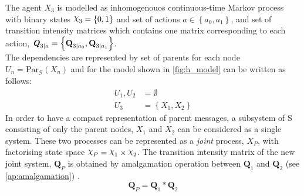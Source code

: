 The agent  $ X_{3} $ is modelled as inhomogenouos continuous-time Markov process with binary states $ \rchi_{3} = \left\lbrace 0, 1 \right\rbrace  $ and set of actions $ a \in \left\lbrace a_0, a_1\right\rbrace  $, and set of transition intensity matrices which contains one matrix corresponding to each action, $ \textbf{\textit{Q}}_{3 \mid a} = \left\lbrace \textbf{Q}_{3\mid a_{0}}, \textbf{Q}_{3\mid a_{1}} \right\rbrace $.\\
The dependencies are represented by set of parents for each node $ U_{n} = \mathrm{Par}_{\mathcal{G}}(X_n) $ and for the model shown in \cref{fig:h_model} can be written as follows:
\begin{align*}
U_{1}, U_{2} & = \emptyset \\
U_{3} & = \left\lbrace X_1, X_2 \right\rbrace 
\end{align*}
In order to have a compact representation of parent messages, a subsystem of S consisting of only the parent nodes, $ X_1 $ and $ X_2 $ can be considered as a single system. These two processes can be represented as a \textit{joint} process, $ X_P $, with factorising state space $ \rchi_{P} = \rchi_1 \times \rchi_2  $. The transition intensity matrix of the new joint system, $ \textbf{Q}_P $ is obtained by amalgamation operation between $ \textbf{Q}_{1} $ and  $ \textbf{Q}_{2} $ (see \cref{ap:amalgamation}) \cite{Nodelman1995}.
\begin{equation}
\textbf{Q}_P = \textbf{Q}_{1} * \textbf{Q}_{2}
\end{equation}

